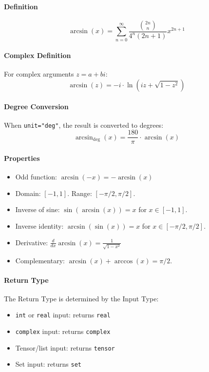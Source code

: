 \paragraph{Definition}
\[
\arcsin(x) = \sum_{n=0}^{\infty} \frac{\binom{2n}{n}}{4^n (2n+1)} x^{2n+1}
\]

\paragraph{Complex Definition}
For complex arguments $z = a + bi$:
\[
\arcsin(z) = -i \cdot \ln\left(iz + \sqrt{1 - z^2}\right)
\]

\paragraph{Degree Conversion}
When \texttt{unit="deg"}, the result is converted to degrees:
\[
\arcsin_{\text{deg}}(x) = \frac{180}{\pi} \cdot \arcsin(x)
\]

\paragraph{Properties}
\begin{itemize}
\item Odd function: $\arcsin(-x) = -\arcsin(x)$
\item Domain: $[-1, 1]$. Range: $[-\pi/2, \pi/2]$.
\item Inverse of sine: $\sin(\arcsin(x)) = x$ for $x \in [-1, 1]$.
\item Inverse identity: $\arcsin(\sin(x)) = x$ for $x \in [-\pi/2, \pi/2]$.
\item Derivative: $\frac{d}{dx}\arcsin(x) = \frac{1}{\sqrt{1 - x^2}}$
\item Complementary: $\arcsin(x) + \arccos(x) = \pi/2$.
\end{itemize}

\paragraph{Return Type}
The Return Type is determined by the Input Type:
\begin{itemize}
\item \texttt{int} or \texttt{real} input: returns \texttt{real}
\item \texttt{complex} input: returns \texttt{complex}
\item Tensor/list input: returns \texttt{tensor}
\item Set input: returns \texttt{set}
\end{itemize}

